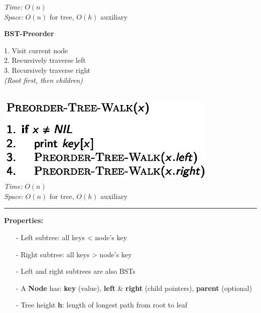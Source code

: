 {\begin{minipage}[t]{1\textwidth}
\begin{minipage}[t]{0.19\textwidth}
        \textit{Time:} \(O(n)\)\\
        \textit{Space:} \(O(n)\) for tree, \(O(h)\) auxiliary
    \end{minipage}
    \hfill
    \begin{minipage}[t]{0.19\textwidth}
        \centering
        \textbf{\scriptsize BST-Preorder}\\[2pt]
        \scriptsize
        \begin{minipage}[t]{\textwidth}
            \scriptsize
            1. Visit current node\\
            2. Recursively traverse left\\
            3. Recursively traverse right\\
            \textit{(Root first, then children)}
        \end{minipage}\\[4pt]
        \includegraphics[width=0.8\textwidth]{images/bst-preorder.png}\\
        \textit{Time:} \(O(n)\)\\
        \textit{Space:} \(O(n)\) for tree, \(O(h)\) auxiliary
        \begin{minipage}[t]{1.6\textwidth}
        \hrule
        \end{minipage}
        \vspace{2pt}
        \textbf{Properties:}\\
        \begin{minipage}[t]{1.6\textwidth}
            \begin{itemize}
            \item[-] Left subtree: all keys < node's key
            \item[-] Right subtree: all keys > node's key
            \item[-] Left and right subtrees are also BSTs
            \item[-] A \textbf{Node} has: \textbf{key} (value), \textbf{left} \& \textbf{right} (child pointers), \textbf{parent} (optional)
            \item[-] Tree height \textbf{h}: length of longest path from root to leaf

\end{itemize}
\end{minipage}
\end{minipage}
\end{minipage}}
